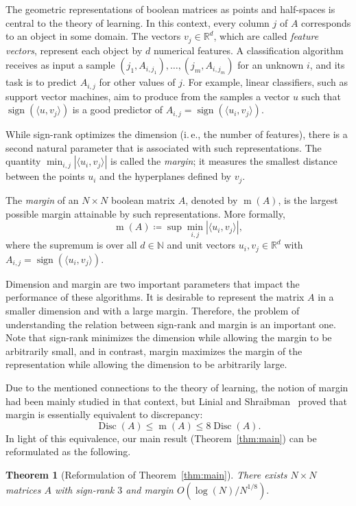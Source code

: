 \documentclass[11pt]{article}
\numberwithin{equation}{section}
\newtheorem{theorem}{Theorem}[section]
\theoremstyle{definition}
\theoremstyle{plain}
\newcommand{\R}{\mathbb R}
\newcommand{\N}{\mathbb N}
\newcommand{\ie}{i.\,e.}
\theoremstyle{definition}\newtheorem{problem}[theorem]{Problem}\theoremstyle{plain}
\DeclareMathOperator{\Disc}{Disc}
\DeclareMathOperator{\sign}{sign}
\DeclareMathOperator{\margin}{m}
\newcommand{\defeq}{\coloneqq}
\begin{document}
The geometric representations of boolean matrices as points and half-spaces is central to the  theory of learning. In this context, every column $j$ of $A$ corresponds to an object in some domain. The vectors $v_j \in \R^d$, which are called \emph{feature vectors}, represent each object by  $d$ numerical features.  A classification algorithm receives as input a sample $(j_1,A_{i,j_1}),\ldots,(j_m,A_{i,j_m})$ for an unknown $i$, and its task is to predict $A_{i,j}$ for other values of $j$. For example, linear classifiers, such as support vector machines, aim to produce from the samples a vector $u$ such that $\sign(\langle u,v_j\rangle)$ is a good predictor of $A_{i,j}=\sign(\langle u_i,v_j\rangle)$. 


While sign-rank optimizes the dimension (\ie, the number of features), there is a second natural parameter that is associated with such representations. The quantity $\min_{i,j} |\langle u_i,v_j \rangle|$ is called the \emph{margin}; it measures the smallest distance between the points $u_i$ and the hyperplanes defined by $v_j$.   

The \emph{margin} of an $N \times N$ boolean matrix  $A$, denoted by $\margin(A)$, is the largest possible margin attainable by such representations. More formally,  
$$\margin(A) \defeq \sup \min_{i,j}\left|\langle u_i,v_j \rangle \right|,$$
where the supremum is over all $d \in \N$ and  unit vectors $u_i, v_j \in \R^d$ with $A_{i,j}=\sign(\langle u_i,v_j \rangle)$. 
 
Dimension and margin are two important parameters that impact   the performance of these algorithms. It is desirable to represent the matrix $A$ in a smaller dimension and with a large margin. Therefore, the problem of understanding the relation between sign-rank and margin is an important one. Note that sign-rank minimizes the dimension while allowing the margin to be arbitrarily small, and in contrast, margin maximizes the margin of the representation while allowing the dimension to be arbitrarily large.


Due to the mentioned connections to the theory of learning, the notion of margin had been mainly studied in that context, but Linial and Shraibman~\cite{MR2497381} proved that margin is essentially equivalent to discrepancy:
$$\Disc(A) \le \margin(A) \le 8 \Disc(A).$$
In light of this equivalence, our main result (Theorem~\ref{thm:main}) can be reformulated as the following. 

\begin{theorem}[Reformulation of Theorem~\ref{thm:main}]
\label{thm:signrankMargin}
There exists   $N \times N$ matrices $A$ with sign-rank $3$ and   margin $O(\log(N)/N^{1/8}).$
\end{theorem}
\end{document}
